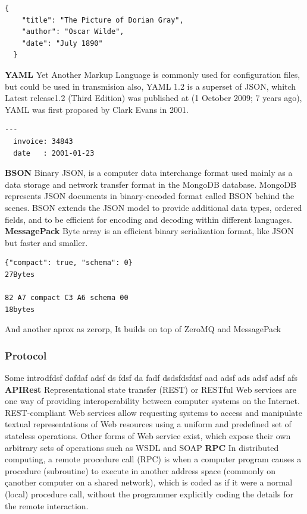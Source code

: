 \begin{lstlisting}[frame=none,numbers=none]
  {
    "title": "The Picture of Dorian Gray",
    "author": "Oscar Wilde",
    "date": "July 1890"
  }
\end{lstlisting}


\noindent \textbf{YAML}
\intro
Yet Another Markup Language is commonly used for configuration files, but could
be used in transmision also, YAML 1.2 is a superset of JSON, whitch Latest release1.2
(Third Edition) was published at (1 October 2009; 7 years ago), YAML was first
proposed by Clark Evans in 2001.

\begin{lstlisting}[frame=none,numbers=none]
  ---
  invoice: 34843
  date   : 2001-01-23
\end{lstlisting}


\noindent \textbf{BSON}
\intro
Binary JSON, is a computer data interchange format used mainly as a data storage
and network transfer format in the MongoDB database.
MongoDB represents JSON documents in binary-encoded format called BSON behind
the scenes. BSON extends the JSON model to provide additional data types,
ordered fields, and to be efficient for encoding and decoding within different languages.
\intro
\noindent \textbf{MessagePack}
\intro
Byte array is an efficient binary serialization format, like JSON but faster and smaller.

\begin{lstlisting}[frame=none,numbers=none]
{"compact": true, "schema": 0}
27Bytes

82 A7 compact C3 A6 schema 00
18bytes
\end{lstlisting}
\noindent And another aprox as zerorp, It builds on top of ZeroMQ and MessagePack

\subsubsection{Protocol}

Some introdfdsf dafdaf adsf ds fdsf da fadf dsdsfdsfdsf aad adsf ads adsf adsf afs
\intro
\noindent \textbf{APIRest}
\intro
Representational state transfer (REST) or RESTful Web services are one way of
providing interoperability between computer systems on the Internet. REST-compliant
Web services allow requesting systems to access and manipulate textual representations
of Web resources using a uniform and predefined set of stateless operations. Other
forms of Web service exist, which expose their own arbitrary sets of operations such as
WSDL and SOAP
\intro
\noindent \textbf{RPC}
\intro
In distributed computing, a remote procedure call (RPC) is when a computer program
causes a procedure (subroutine) to execute in another address space (commonly on
çanother computer on a shared network), which is coded as if it were a normal (local)
procedure call, without the programmer explicitly coding the details for the remote interaction.


